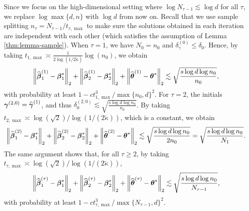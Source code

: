  Since we focus on the high-dimensional setting where $\log N_{\tau-1}  \lesssim \log d$ for all $\tau$, we replace $\log\max\{d, n\}$ with  $\log d$ from now on. Recall that we use sample splitting $n_{\tau}=N_{\tau-1}/t_{\tau, \max}$ to make sure the solutions obtained in each iteration are independent with each other (which satisfies the assumption of Lemma \ref{thm:lemma-sample}). When $\tau=1$, we have $N_0=n_0$ and  $\delta_{\gamma}^{(0)}\leq \delta_{0}$. Hence,  by taking $t_{1, \max} \asymp \frac{1}{2\log(1/2\tilde{\kappa})}\log (n_0)$, we obtain 
\[
\left\lVert\widehat{\boldsymbol{\beta}}_1^{(1)} - \boldsymbol{\beta}_1^*\right\rVert_2 + \left\lVert\widehat{\boldsymbol{\beta}}_2^{(1)} - \boldsymbol{\beta}_2^*\right\rVert_2 + \left\lVert\widehat{\boldsymbol{\theta}}^{(1)} - \boldsymbol{\theta}^*\right\rVert_2  \lesssim \sqrt{\frac{s\log d \log n_0}{n_0}},
\]
with probability at least $1-ct_{1,\max}^3 / \max\{n_0, d\}^2$.
For $\tau=2$, the initials $\boldsymbol{\gamma}^{(2, 0)}=\widehat{\boldsymbol{\gamma}}^{(1)}$, and thus $\delta_0^{(2, 0)}\lesssim \sqrt{\frac{s \log d \log n_0}{n_0}}$. By taking $t_{2, \max} \asymp \log(\sqrt{2})/\log(1/(2\tilde{\kappa}))$, which is a constant, we obtain
 \[
 \left\lVert\widehat{\boldsymbol{\beta}}_1^{(2)} - \boldsymbol{\beta}_1^*\right\rVert_2 + \left\lVert\widehat{\boldsymbol{\beta}}_2^{(2)} - \boldsymbol{\beta}_2^*\right\rVert_2 + \left\lVert\widehat{\boldsymbol{\theta}}^{(2)} - \boldsymbol{\theta}^*\right\rVert_2  \lesssim \sqrt{\frac{s\log d \log n_0}{2n_0}} = \sqrt{\frac{s\log d \log n_0}{N_1}}.
 \]
 The same argument shows that, for all $\tau \geq 2$, by taking $t_{\tau, \max} \asymp \log(\sqrt{2})/\log(1/(2\tilde{\kappa}))$,
  \[
 \left\lVert\widehat{\boldsymbol{\beta}}_1^{(\tau)} - \boldsymbol{\beta}_1^*\right\rVert_2 + \left\lVert\widehat{\boldsymbol{\beta}}_2^{(\tau)} - \boldsymbol{\beta}_2^*\right\rVert_2 + \left\lVert\widehat{\boldsymbol{\theta}}^{(\tau)} - \boldsymbol{\theta}^*\right\rVert_2  \lesssim \sqrt{\frac{s\log d \log n_0}{N_{\tau-1}}},
 \]
 with probability at least $1-c t_{\tau, \max}^3 / \max\{N_{\tau-1}, d\}^2$.
